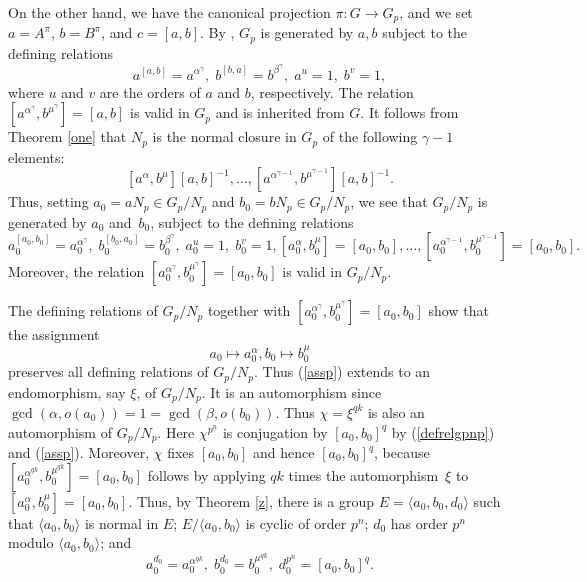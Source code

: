 \documentclass{amsart}
\theoremstyle{definition}
\theoremstyle{remark}
\begin{document}
On the other hand, we have the canonical projection $\pi:G\to G_p$, and we set $a=A^\pi$, $b=B^\pi$, and $c=[a,b]$.
By \cite[Corollary 5.2]{MS}, $G_p$ is generated by $a,b$ subject to the defining relations
\begin{equation}
\label{defrelgp}
a^{[a,b]}=a^{\alpha^\gamma},\; b^{[b,a]}=b^{\beta^\gamma},\; a^u=1,\; b^v=1,
\end{equation}
where $u$ and $v$ are the orders of $a$ and $b$, respectively. The relation $[a^{\alpha^\gamma},b^{\mu^\gamma}]=[a,b]$ is valid in $G_p$
and is inherited from $G$. It follows from Theorem \ref{one} that $N_p$ is the normal closure in $G_p$ 
of the following $\gamma-1$ elements:
\begin{equation}
\label{robin}
[a^\alpha,b^\mu][a,b]^{-1},\dots, [a^{\alpha^{\gamma-1}},b^{\mu^{\gamma-1}}][a,b]^{-1}.
\end{equation}
Thus, setting $a_0=a N_p\in G_p/N_p$ and $b_0=b N_p\in G_p/N_p$, we see that $G_p/N_p$
is generated by $a_0$ and~$b_0$, subject to the defining relations
\begin{equation}
\label{defrelgpnp}
a_0^{[a_0,b_0]}=a_0^{\alpha^\gamma},\; 
b_0^{[b_0,a_0]}=b_0^{\beta^\gamma},\; a_0^u=1,\; b_0^v=1,
[a_0^\alpha,b_0^\mu]=[a_0,b_0],\dots, 
[a_0^{\alpha^{\gamma-1}},b_0^{\mu^{\gamma-1}}]=[a_0,b_0].
\end{equation}
Moreover, the relation $[a_0^{\alpha^\gamma},b_0^{\mu^\gamma}]=[a_0,b_0]$ is valid in $G_p/N_p$. 

The defining relations of $G_p/N_p$ together with 
$[a_0^{\alpha^\gamma},b_0^{\mu^\gamma}]=[a_0,b_0]$ show that the assignment
\begin{equation}
\label{assp}
a_0\mapsto a_0^\alpha, b_0\mapsto b_0^\mu
\end{equation}
preserves all defining relations of $G_p/N_p$. Thus (\ref{assp}) 
extends to an endomorphism, say $\xi$, of $G_p/N_p$. It is an automorphism since $\gcd(\alpha,o(a_0))=1=\gcd(\beta,o(b_0))$.
Thus $\chi=\xi^{q k}$ is also an automorphism of $G_p/N_p$. Here $\chi^{p^n}$ is
conjugation by $[a_0,b_0]^q$ by (\ref{defrelgpnp})  and (\ref{assp}). Moreover, $\chi$ fixes $[a_0,b_0]$ and hence $[a_0,b_0]^q$, because
$
[a_0^{\alpha^{qk}},b_0^{\mu^{qk}}]=[a_0,b_0]
$
follows by applying $qk$ times the automorphism~$\xi$ to 
$
[a_0^\alpha,b_0^\mu]=[a_0,b_0].
$
Thus, by Theorem \ref{z}, there is a group $E=\langle a_0,b_0,d_0\rangle$ such that $\langle a_0,b_0\rangle$ is normal in $E$; $E/\langle a_0,b_0\rangle$
is cyclic of order $p^n$; $d_0$ has order $p^n$ modulo 
$\langle a_0,b_0\rangle$; and 
\begin{equation}
\label{rele}
a_0^{d_0}=a_0^{\alpha^{qk}},\; b_0^{d_0}=b_0^{\mu^{qk}},\; d_0^{p^n}=[a_0,b_0]^q. 
\end{equation}
\end{document}
